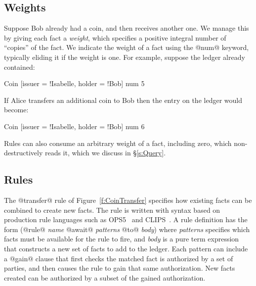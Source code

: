 

\subsection{Weights}
\label{s:Weights}
Suppose Bob already had a coin, and then receives another one. We manage this by giving each fact a \emph{weight}, which specifies a positive integral number of ``copies'' of the fact. We indicate the weight of a fact using the @num@ keyword, typically eliding it if the weight is one. For example, suppose the ledger already contained:
\begin{small}
\begin{code}
 Coin [issuer = !Isabelle, holder = !Bob]  num 5
\end{code}
\end{small}
%
If Alice transfers an additional coin to Bob then the entry on the ledger would become:
\begin{small}
\begin{code}
 Coin [issuer = !Isabelle, holder = !Bob]  num 6
\end{code}
\end{small}
%
Rules can also consume an arbitrary weight of a fact, including zero, which non-destructively reads it, which we discuss in \S\ref{s:Query}.


\subsection{Rules}
The @transfer@ rule of Figure~\ref{f:CoinTransfer} specifies how existing facts can be combined to create new facts. The rule is written with syntax based on production rule languages such as OPS5~\cite{Forgy1981:OPS5} and CLIPS~\cite{Riley2017:CLIPS}. A rule definition has the form (@rule@ \emph{name} @await@ \emph{patterns} @to@ \emph{body}) where \emph{patterns} specifies which facts must be available for the rule to fire, and \emph{body} is a pure term expression that constructs a new set of facts to add to the ledger. Each pattern can include a @gain@ clause that first checks the matched fact is authorized by a set of parties, and then causes the rule to gain that same authorization. New facts created can be authorized by a subset of the gained authorization.


